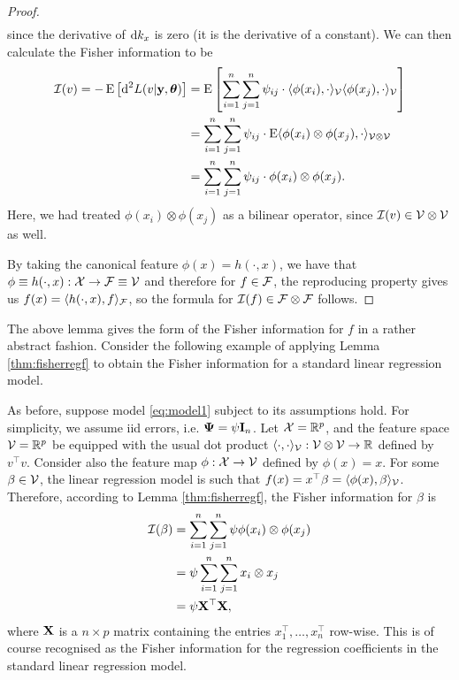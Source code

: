\begin{proof}
\begin{align*}
	\end{align*}
	since the derivative of $\text{d} k_{x}$ is zero (it is the derivative of a constant).
	We can then calculate the Fisher information to be
	\begin{align*}
		{\mathcal I}(v) = -\operatorname{E} \big[ \text{d}^2 L(v|{\mathbf y},{\bm\theta}) \big] 
		&=\operatorname{E} \left[ \sum_{i=1}^n\sum_{j=1}^n \psi_{ij} \cdot \langle \phi(x_i), \cdot \rangle_{{\mathcal V}} \langle \phi(x_j), \cdot \rangle_{{\mathcal V}} \right] \\
		&= \sum_{i=1}^n\sum_{j=1}^n \psi_{ij} \cdot \operatorname{E}\langle \phi(x_i) \otimes \phi(x_j), \cdot \rangle_{{\mathcal V}\otimes{\mathcal V}}  \\		
		&=\sum_{i=1}^n\sum_{j=1}^n \psi_{ij} \cdot \phi(x_i) \otimes \phi(x_j).
	\end{align*}	 	
	Here, we had treated $\phi(x_i) \otimes \phi(x_j)$ as a bilinear operator, since ${\mathcal I}(v) \in {\mathcal V} \otimes {\mathcal V}$ as well.
	
	By taking the canonical feature $\phi(x)=h(\cdot,x)$, we have that $\phi \equiv h(\cdot,x):{\mathcal X}\to{\mathcal F} \equiv {\mathcal V}$ and therefore for $f\in{\mathcal F}$, the reproducing property gives us $f(x) = \langle h(\cdot,x),f\rangle_{\mathcal F}$, so the formula for ${\mathcal I}(f) \in {\mathcal F} \otimes {\mathcal F}$ follows.
\end{proof}

The above lemma gives the form of the Fisher information for $f$ in a rather abstract fashion.
Consider the following example of applying Lemma \eqref{thm:fisherregf} to obtain the Fisher information for a standard linear regression model.

\begin{example}
  As before, suppose model \eqref{eq:model1} subject to its assumptions hold.
  For simplicity, we assume iid errors, i.e. ${\bm\Psi} = \psi {\mathbf I}_n$.
  Let ${\mathcal X} = \mathbb{R}^p$, and the feature space ${\mathcal V} = \mathbb{R}^p$ be equipped with the usual dot product $\langle\cdot,\cdot\rangle_{\mathcal V}:{\mathcal V} \otimes {\mathcal V} \to \mathbb{R}$ defined by $v^\top v$.
  Consider also the feature map $\phi:{\mathcal X} \to {\mathcal V}$ defined by $\phi(x)=x$.
  For some $\beta \in {\mathcal V}$, the linear regression model is such that $f(x) = x^\top \beta = \langle\phi(x),\beta\rangle_{\mathcal V}$.
  Therefore, according to Lemma \eqref{thm:fisherregf}, the Fisher information for $\beta$ is
  \begin{align*}
    {\mathcal I}(\beta) 
    &= \sum_{i=1}^n\sum_{j=1}^n \psi \phi(x_i) \otimes \phi(x_j) \\
    &= \psi \sum_{i=1}^n\sum_{j=1}^n x_i \otimes x_j \\
    &= \psi {\mathbf X}^\top {\mathbf X},
  \end{align*}
  where ${\mathbf X}$ is a $n \times p$ matrix containing the entries $x_1^\top,\dots,x_n^\top$ row-wise.
  This is of course recognised as the Fisher information for the regression coefficients in the standard linear regression model.
\end{example}

